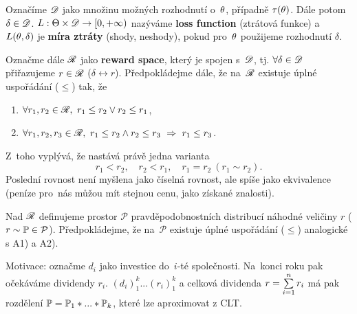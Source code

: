 \begin{define}
	Označíme $\mathscr{D}$ jako množinu možných rozhodnutí o~$\theta$, případně $\tau(\theta)$. Dále potom $\delta\in\mathscr{D}$. $L:\Theta\times\mathscr{D}\to[0,+\infty)$ nazýváme \textbf{loss function} (ztrátová funkce) a~$L(\theta,\delta)$ je \textbf{míra ztráty} (shody, neshody), pokud pro~$\theta$ použijeme rozhodnutí $\delta$.
	
	Označme dále $\mathscr{R}$ jako \textbf{reward space}, který je spojen s~$\mathscr{D}$, tj. $\forall\delta\in\mathscr{D}$ přiřazujeme $r\in\mathscr{R}$ ($\delta\leftrightarrow r$). Předpokládejme dále, že na~$\mathscr{R}$ existuje úplné uspořádání ($\leq$) tak, že \begin{enumerate}[{A}1)]
		\item $\forall r_1,r_2\in\mathscr{R},~r_1\leq r_2 \vee r_2\leq r_1$,
		\item $\forall r_1,r_2,r_3\in\mathscr{R},~r_1\leq r_2 \wedge r_2\leq r_3~\Rightarrow~r_1\leq r_3$. 
	\end{enumerate}Z~toho vyplývá, že nastává právě jedna varianta
$$ r_1<r_2,\quad r_2<r_1,\quad r_1=r_2~(r_1\sim r_2).$$
Poslední rovnost není myšlena jako číselná rovnost, ale spíše jako ekvivalence (peníze pro~nás můžou mít stejnou cenu, jako získané znalosti).

	Nad $\mathscr{R}$ definujeme prostor $\mathcal{P}$ pravděpodobnostních distribucí náhodné veličiny $r$ ($r\sim\mathbb{P}\in\mathcal{P}$). Předpokládejme, že na~$\mathcal{P}$ existuje úplné uspořádání ($\leq$) analogické s A1) a A2).
\end{define}

Motivace: označme $d_i$ jako investice do~$i$-té společnosti. Na~konci roku pak očekáváme dividendy $r_i$. $(d_i)_1^k...(r_i)_1^k$ a celková dividenda $r=\sum\limits_{i=1}^{n} r_i$ má pak rozdělení $\mathbb{P}=\mathbb{P}_1\ast...\ast\mathbb{P}_k$, které lze aproximovat z CLT.


